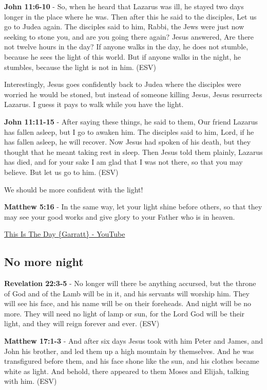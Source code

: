 \documentclass[11pt]{article}
\begin{document}
\textbf{John 11:6-10} - So, when he heard that Lazarus was ill, he stayed two days longer in the place where he was. Then after this he said to the disciples, Let us go to Judea again. The disciples said to him, Rabbi, the Jews were just now seeking to stone you, and are you going there again? Jesus answered, Are there not twelve hours in the day? If anyone walks in the day, he does not stumble, because he sees the light of this world. But if anyone walks in the night, he stumbles, because the light is not in him. (ESV)

Interestingly, Jesus goes confidently back to Judea where the disciples were worried he would be stoned, but instead of someone killing Jesus, Jesus resurrects Lazarus. I guess it pays to walk while you have the light.

\textbf{John 11:11-15} - After saying these things, he said to them, Our friend Lazarus has fallen asleep, but I go to awaken him. The disciples said to him, Lord, if he has fallen asleep, he will recover. Now Jesus had spoken of his death, but they thought that he meant taking rest in sleep. Then Jesus told them plainly, Lazarus has died, and for your sake I am glad that I was not there, so that you may believe. But let us go to him. (ESV)

We should be more confident with the light!

\textbf{Matthew 5:16} - In the same way, let your light shine before others, so that they may see your good works and give glory to your Father who is in heaven.

\href{https://www.youtube.com/watch?v=T9Eqm8uIuck}{This Is The Day \{Garratt\} - YouTube}

\subsection{No more night}
\label{sec:org827a411}

\textbf{Revelation 22:3-5} -  No longer will there be anything accursed, but the throne of God and of the Lamb will be in it, and his servants will worship him.  They will see his face, and his name will be on their foreheads.  And night will be no more.  They will need no light of lamp or sun, for the Lord God will be their light, and they will reign forever and ever. (ESV)

\textbf{Matthew 17:1-3} -  And after six days Jesus took with him Peter and James, and John his brother, and led them up a high mountain by themselves.  And he was transfigured before them, and his face shone like the sun, and his clothes became white as light.  And behold, there appeared to them Moses and Elijah, talking with him.  (ESV)
\end{document}
